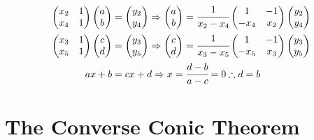 \begin{align}
    \begin{pmatrix}
        x_2 & 1 \\ x_4 & 1
    \end{pmatrix}  
    \begin{pmatrix}
        a \\ b
    \end{pmatrix} &=
    \begin{pmatrix}
        y_2 \\ y_4
    \end{pmatrix} \Rightarrow 
    \begin{pmatrix}
        a \\ b
    \end{pmatrix} = \cfrac{1}{x_2 - x_4}
    \begin{pmatrix}
        1 & -1 \\ -x_4 & x_2
    \end{pmatrix}  
    \begin{pmatrix}
        y_2 \\ y_4
    \end{pmatrix} \\
    \begin{pmatrix}
        x_3 & 1 \\ x_5 & 1
    \end{pmatrix}  
    \begin{pmatrix}
        c \\ d
    \end{pmatrix} &=
    \begin{pmatrix}
        y_3 \\ y_5
    \end{pmatrix} \Rightarrow 
    \begin{pmatrix}
        c \\ d
    \end{pmatrix} = \cfrac{1}{x_3 - x_5}
    \begin{pmatrix}
        1 & -1 \\ -x_5 & x_3
    \end{pmatrix}  
    \begin{pmatrix}
        y_3 \\ y_5
    \end{pmatrix} \\
    ax + b &= cx + d \Rightarrow x = \cfrac{d-b}{a-c} = 0 \therefore d = b
\end{align}

\newpage

\section{The Converse Conic Theorem}

